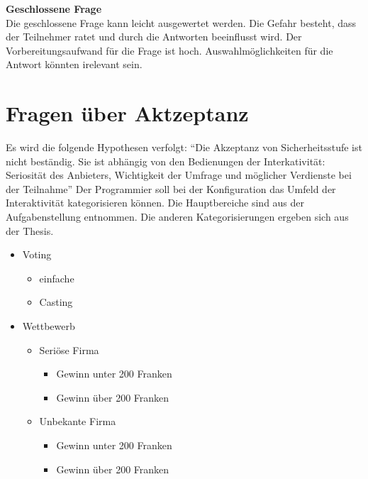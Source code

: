 \textbf{Geschlossene Frage}\\
Die geschlossene Frage kann leicht ausgewertet werden. Die Gefahr
besteht, dass der Teilnehmer ratet und durch die Antworten beeinflusst
wird. Der Vorbereitungsaufwand für die Frage ist hoch.
Auswahlmöglichkeiten für die Antwort könnten irelevant sein.

\newpage

\section{Fragen über Aktzeptanz}\label{fragen-uxfcber-aktzeptanz}

Es wird die folgende Hypothesen verfolgt: ``Die Akzeptanz von
Sicherheitsstufe ist nicht beständig. Sie ist abhängig von den
Bedienungen der Interkativität: Seriosität des Anbieters, Wichtigkeit
der Umfrage und möglicher Verdienste bei der Teilnahme'' Der Programmier
soll bei der Konfiguration das Umfeld der Interaktivität kategorisieren
können. Die Hauptbereiche sind aus der Aufgabenstellung entnommen. Die
anderen Kategorisierungen ergeben sich aus der Thesis.

\begin{itemize}
\item
  Voting

  \begin{itemize}
  \item
    einfache
  \item
    Casting
  \end{itemize}
\item
  Wettbewerb

  \begin{itemize}
  \item
    Seriöse Firma

    \begin{itemize}
    \item
      Gewinn unter 200 Franken
    \item
      Gewinn über 200 Franken
    \end{itemize}
  \item
    Unbekante Firma

    \begin{itemize}
    \item
      Gewinn unter 200 Franken
    \item
      Gewinn über 200 Franken
    \end{itemize}
  \end{itemize}
\end{itemize}

